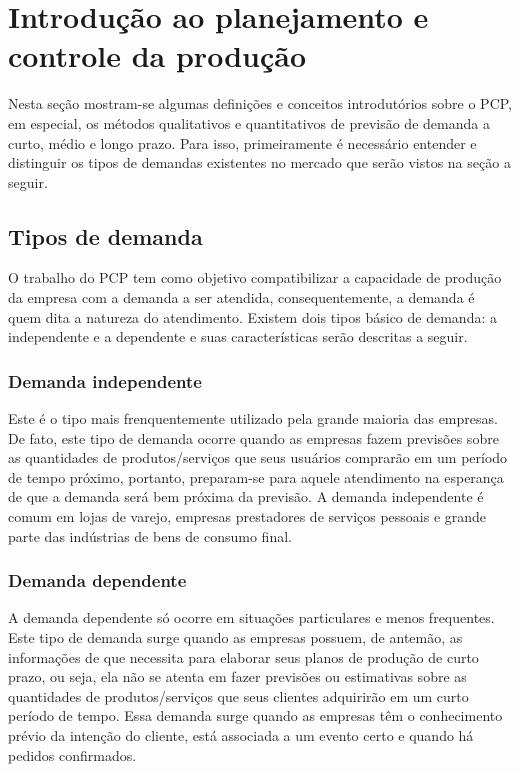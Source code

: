 \chapter{Introdução ao planejamento e controle da produção}
\label{chap:introducao_ao_planejamento}

Nesta seção mostram-se algumas definições e conceitos introdutórios sobre o \ac{PCP}, em especial, os métodos qualitativos e quantitativos de previsão de demanda a curto, médio e longo prazo. Para isso, primeiramente é necessário entender e distinguir os tipos de demandas existentes no mercado que serão vistos na seção a seguir.

\section{Tipos de demanda}
\label{sec:introducao_ao_planejamento_sec1}

O trabalho do \ac{PCP} tem como objetivo compatibilizar a capacidade de produção da empresa com a demanda a ser atendida, consequentemente, a demanda é quem dita a natureza do atendimento. Existem dois tipos básico de demanda: a independente e a dependente e suas características serão descritas a seguir.

\subsection{Demanda independente}

Este é o tipo mais frenquentemente utilizado pela grande maioria das empresas. De fato, este tipo de demanda ocorre quando as empresas fazem previsões sobre as quantidades de produtos/serviços que seus usuários comprarão em um período de tempo próximo, portanto, preparam-se para aquele atendimento na esperança de que a demanda será bem próxima da previsão. A demanda independente é comum em lojas de varejo, empresas prestadores de serviços pessoais e grande parte das indústrias de bens de consumo final.

\subsection{Demanda dependente}

A demanda dependente só ocorre em situações particulares e menos frequentes. Este tipo de demanda surge quando as empresas possuem, de antemão, as informações de que necessita para elaborar seus planos de produção de curto prazo, ou seja, ela não se atenta em fazer previsões ou estimativas sobre as quantidades de produtos/serviços que seus clientes adquirirão em um curto período de tempo. Essa demanda surge quando as empresas têm o conhecimento prévio da intenção do cliente, está associada a um evento certo e quando há pedidos confirmados.

